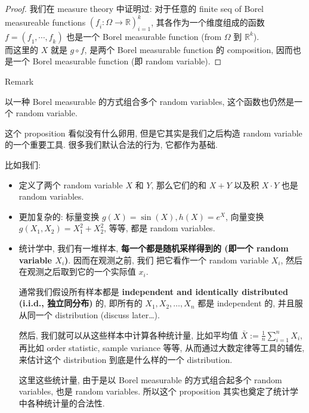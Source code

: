 \begin{proof}

我们在 measure theory 中证明过: 对于任意的 finite seq of Borel measureable functions \((\mathit{f}_{\mathit{i}}:\Omega\rightarrow\mathbb{R})_{\mathit{i} = 1}^{\mathit{k}}\), 其各作为一个维度组成的函数 \(\mathit{f} = (\mathit{f}_{1},\cdots,\mathit{f}_{\mathit{k}})\) 也是一个 Borel measurable function (from \(\Omega\) 到 \(\mathbb{R}^{\mathit{k}}\)).\\
而这里的 \(\mathit{X}\) 就是 \(\mathit{g} \circ \mathit{f}\), 是两个 Borel measurable function 的 composition, 因而也是一个 Borel measurable function (即 random variable).

\end{proof}

\begin{qlremark}{Remark}

以一种 Borel measurable 的方式组合多个 random variables, 这个函数也仍然是一个 random variable.

这个 proposition 看似没有什么卵用, 但是它其实是我们之后构造 random variable 的一个重要工具. 很多我们默认合法的行为, 它都作为基础.

比如我们:

\begin{itemize}
\item
  定义了两个 random variable \(\mathit{X}\) 和 \(\mathit{Y}\), 那么它们的和 \(\mathit{X} + \mathit{Y}\) 以及积 \(\mathit{X} \cdot \mathit{Y}\) 也是 random variables.
\item
  更加复杂的: 标量变换 \(\mathit{g}(\mathit{X}) = \sin(\mathit{X}),h(\mathit{X}) = \mathit{e}^{\mathit{X}}\), 向量变换 \(\mathit{g}(\mathit{X}_{1},\mathit{X}_{2}) = \mathit{X}_{1}^{2} + \mathit{X}_{2}^{2}\), 等等, 都是 random variables.
\item
  统计学中, 我们有一堆样本, \textbf{每一个都是随机采样得到的 (即一个 random variable \(\mathit{X}_{\mathit{i}}\))}. 因而在观测之前, 我们 把它看作一个 random variable \(\mathit{X}_{\mathit{i}}\), 然后在观测之后取到它的一个实际值 \(\mathit{x}_{\mathit{i}}\).

  通常我们假设所有样本都是 \textbf{independent and identically distributed (i.i.d., 独立同分布)} 的, 即所有的 \(\mathit{X}_{1},\mathit{X}_{2},\ldots,\mathit{X}_{\mathit{n}}\) 都是 independent 的, 并且服从同一个 distribution (discuss later\ldots).

  然后, 我们就可以从这些样本中计算各种统计量, 比如平均值 \(\bar{\mathit{X}} := \frac{1}{\mathit{n}}\sum_{\mathit{i} = 1}^{\mathit{n}}\mathit{X}_{\mathit{i}}\), 再比如 order statistic, sample variance 等等, 从而通过大数定律等工具的辅佐, 来估计这个 distribution 到底是什么样的一个 distribution.

  这里这些统计量, 由于是以 Borel measurable 的方式组合起多个 random variables, 也是 random variables. 所以这个 proposition 其实也奠定了统计学中各种统计量的合法性.
\end{itemize}

\end{qlremark}

